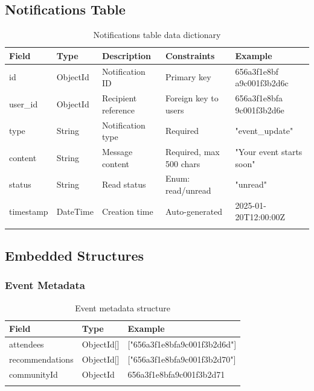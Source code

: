 \subsection{Notifications Table}
\begin{longtable}{|L{3cm}|C{2cm}|L{2.5cm}|L{3cm}|L{3cm}|}
\hline
\textbf{Field} & \textbf{Type} & \textbf{Description} & \textbf{Constraints} & \textbf{Example} \\ \hline
\endhead

id & ObjectId & Notification ID & Primary key & 656a3f1e8bf a9c001f3b2d6c \\ \hline
user\_id & ObjectId & Recipient reference & Foreign key to users & 656a3f1e8bfa 9c001f3b2d6e \\ \hline
type & String & Notification type & Required & "event\_update" \\ \hline
content & String & Message content & Required, max 500 chars & "Your event starts soon" \\ \hline
status & String & Read status & Enum: read/unread & "unread" \\ \hline
timestamp & DateTime & Creation time & Auto-generated & 2025-01-20T12:00:00Z \\ \hline

\caption{Notifications table data dictionary}
\label{tab:notifications_dict}
\end{longtable}

\subsection{Embedded Structures}

\subsubsection{Event Metadata}
\begin{longtable}{|C{3.5cm}|C{1.8cm}|C{6cm}|}
\hline
\textbf{Field} & \textbf{Type} & \textbf{Example} \\ \hline
\endhead

attendees & ObjectId[] & ["656a3f1e8bfa9c001f3b2d6d"] \\ \hline
recommendations & ObjectId[] & ["656a3f1e8bfa9c001f3b2d70"] \\ \hline
communityId & ObjectId & 656a3f1e8bfa9c001f3b2d71 \\ \hline

\caption{Event metadata structure}
\label{tab:event_metadata}
\end{longtable}

